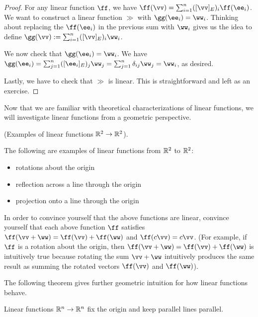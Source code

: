 \begin{proof}
    For any linear function $\ff$, we have $\ff(\vv) = \sum_{i = 1}^n ([\vv]_E)_i \ff(\ee_i)$. We want to construct a linear function $\gg$ with $\gg(\ee_i) = \ww_i$. Thinking about replacing the $\ff(\ee_i)$ in the previous sum with $\ww_i$ gives us the idea to define $\gg(\vv) := \sum_{i = 1}^n ([\vv]_E)_i \ww_i$. 
    
    We now check that $\gg(\ee_i) = \ww_i$. We have $\gg(\ee_i) = \sum_{j = 1}^n ([\ee_i]_E)_j \ww_j = \sum_{j = 1}^n \delta_{ij} \ww_j = \ww_i$, as desired. 
    
    Lastly, we have to check that $\gg$ is linear. This is straightforward and left as an exercise.
\end{proof}

Now that we are familiar with theoretical characterizations of linear functions, we will investigate linear functions from a geometric perspective.

\begin{remark}
    (Examples of linear functions $\mathbb{R}^2 \rightarrow \mathbb{R}^2$).
    
    The following are examples of linear functions from $\mathbb{R}^2$ to $\mathbb{R}^2$:
    
    \begin{itemize}
        \item rotations about the origin
        \item reflection across a line through the origin
        \item projection onto a line through the origin
    \end{itemize}
    
    In order to convince yourself that the above functions are linear, convince yourself that each above function $\ff$ satisfies $\ff(\vv + \ww) = \ff(\vv) + \ff(\ww)$ and $\ff(c \vv) = c \vv$. (For example, if $\ff$ is a rotation about the origin, then $\ff(\vv + \ww) = \ff(\vv) + \ff(\ww)$ is intuitively true because rotating the sum $\vv + \ww$ intuitively produces the same result as summing the rotated vectors $\ff(\vv)$ and $\ff(\ww)$).  
\end{remark}

The following theorem gives further geometric intuition for how linear functions behave.

\begin{theorem}
    Linear functions $\mathbb{R}^n \rightarrow \mathbb{R}^n$ fix the origin and keep parallel lines parallel.
\end{theorem}

